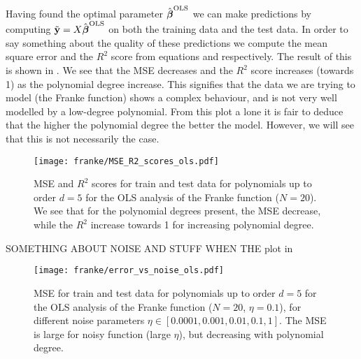             Having found the optimal parameter $\hat{\boldsymbol{\beta}}^{\text{OLS}}$ we can make predictions by computing $\tilde{\mathbf{y}} = X\hat{\boldsymbol{\beta}}^{\text{OLS}}$ on both the training data and the test data. In order to say something about the quality of these predictions we compute the mean square error and the $R^2$ score from equations  and  respectively. The result of this is shown in . We see that the MSE decreases and the $R^2$ score increases (towards 1) as the polynomial degree increase. This signifies that the data we are trying to model (the Franke function) shows a complex behaviour, and is not very well modelled by a low-degree polynomial. From this plot a lone it is fair to deduce that the higher the polynomial degree the better the model. However, we will see that this is not necessarily the case. 

            \begin{figure}
                \texttt{[image: franke/MSE\_R2\_scores\_ols.pdf]}
                \caption{MSE and $R^2$ scores for train and test data for polynomials up to order $d=5$ for the OLS analysis of the Franke function ($N=20$). We  see that for the polynomial degrees present, the MSE decrease, while the $R^2$ increase towards 1 for increasing polynomial  degree. }
                \label{fig:mse_and_r2_for_order5}
            \end{figure}
            
            
            SOMETHING ABOUT NOISE AND STUFF WHEN THE plot in 

            \begin{figure}
                \texttt{[image: franke/error\_vs\_noise\_ols.pdf]}
                \caption{MSE for train and test data for polynomials up to order $d=5$ for the OLS analysis of the Franke function ($N=20$, $\eta=0.1$), for different noise parameters $\eta\in [0.0001, 0.001, 0.01, 0.1,  1]$. The MSE is large for noisy function (large $\eta$), but decreasing with polynomial degree.}
                \label{fig:mse_for_different_noise_ols}
            \end{figure}


